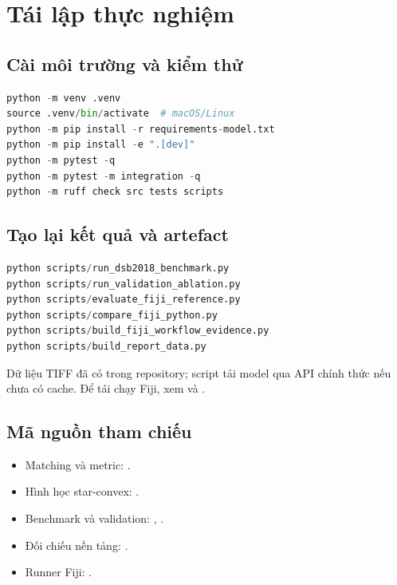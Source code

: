 \documentclass[12pt,a4paper]{report}
\begin{document}
\chapter{Tái lập thực nghiệm}
\label{app:reproduce}
\lstset{basicstyle=\ttfamily\footnotesize}
\section{Cài môi trường và kiểm thử}
\begin{lstlisting}[language=Python]
python -m venv .venv
source .venv/bin/activate  # macOS/Linux
python -m pip install -r requirements-model.txt
python -m pip install -e ".[dev]"
python -m pytest -q
python -m pytest -m integration -q
python -m ruff check src tests scripts
\end{lstlisting}
\section{Tạo lại kết quả và artefact}
\begin{lstlisting}[language=Python]
python scripts/run_dsb2018_benchmark.py
python scripts/run_validation_ablation.py
python scripts/evaluate_fiji_reference.py
python scripts/compare_fiji_python.py
python scripts/build_fiji_workflow_evidence.py
python scripts/build_report_data.py
\end{lstlisting}
Dữ liệu TIFF đã có trong repository; script tải model qua API chính thức nếu
chưa có cache. Để tái chạy Fiji, xem  và
.

\section{Mã nguồn tham chiếu}
\begin{itemize}
\item Matching và metric: .
\item Hình học star-convex: .
\item Benchmark và validation: ,
.
\item Đối chiếu nền tảng: .
\item Runner Fiji: .
\end{itemize}
\end{document}

